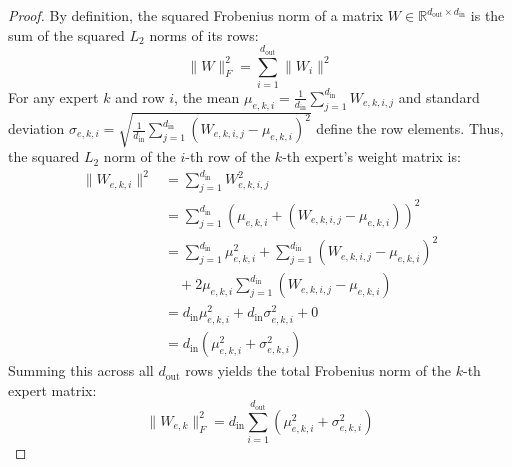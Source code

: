 \documentclass{article}
\theoremstyle{plain}
\theoremstyle{definition}
\theoremstyle{remark}
\begin{document}
\begin{proof}
By definition, the squared Frobenius norm of a matrix $W \in \mathbb{R}^{d_{\mathrm{out}} \times d_{\mathrm{in}}}$ is the sum of the squared $L_2$ norms of its rows:
\begin{equation}
  \|W\|_F^2 = \sum_{i=1}^{d_{\mathrm{out}}} \|W_i\|^2
\end{equation}
For any expert $k$ and row $i$, the mean $\mu_{e, k, i} = \frac{1}{d_{\mathrm{in}}} \sum_{j=1}^{d_{\mathrm{in}}} W_{e, k, i, j}$ and standard deviation $\sigma_{e, k, i} = \sqrt{\frac{1}{d_{\mathrm{in}}} \sum_{j=1}^{d_{\mathrm{in}}} (W_{e, k, i, j} - \mu_{e, k, i})^2}$ define the row elements. Thus, the squared $L_2$ norm of the $i$-th row of the $k$-th expert's weight matrix is:
\begin{equation}
\begin{split}
  \|W_{e, k, i}\|^2 &= \sum_{j=1}^{d_{\mathrm{in}}} W_{e, k, i, j}^2 \\
  &= \sum_{j=1}^{d_{\mathrm{in}}} \left( \mu_{e, k, i} + (W_{e, k, i, j} - \mu_{e, k, i}) \right)^2 \\
  &= \sum_{j=1}^{d_{\mathrm{in}}} \mu_{e, k, i}^2 + \sum_{j=1}^{d_{\mathrm{in}}} (W_{e, k, i, j} - \mu_{e, k, i})^2 \\
  &\quad + 2 \mu_{e, k, i} \sum_{j=1}^{d_{\mathrm{in}}} (W_{e, k, i, j} - \mu_{e, k, i}) \\
  &= d_{\mathrm{in}} \mu_{e, k, i}^2 + d_{\mathrm{in}} \sigma_{e, k, i}^2 + 0 \\
  &= d_{\mathrm{in}} \left( \mu_{e, k, i}^2 + \sigma_{e, k, i}^2 \right)
\end{split}
\end{equation}
Summing this across all $d_{\mathrm{out}}$ rows yields the total Frobenius norm of the $k$-th expert matrix:
\begin{equation}
  \|W_{e, k}\|_F^2 = d_{\mathrm{in}} \sum_{i=1}^{d_{\mathrm{out}}} \left( \mu_{e, k, i}^2 + \sigma_{e, k, i}^2 \right)
\end{equation}


\end{proof}
\end{document}
